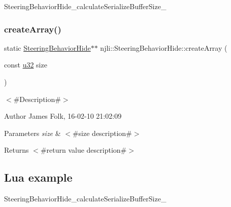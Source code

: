 \begin{DoxyCodeInclude}
\end{DoxyCodeInclude}
Steering\+Behavior\+Hide\+\_\+calculate\+Serialize\+Buffer\+Size\+\_\+ \mbox{\label{classnjli_1_1_steering_behavior_hide_a8fdf4ee83c8a30a75fdf06e111f621a3}} 
\subsubsection{\texorpdfstring{create\+Array()}{createArray()}}
{\footnotesize\ttfamily static \mbox{\hyperlink{classnjli_1_1_steering_behavior_hide}{Steering\+Behavior\+Hide}}$\ast$$\ast$ njli\+::\+Steering\+Behavior\+Hide\+::create\+Array (\begin{DoxyParamCaption}\item[{const \mbox{\hyperlink{_util_8h_a10e94b422ef0c20dcdec20d31a1f5049}{u32}}}]{size }\end{DoxyParamCaption})\hspace{0.3cm}{\ttfamily [static]}}



$<$\#\+Description\#$>$ 

\begin{DoxyAuthor}{Author}
James Folk, 16-\/02-\/10 21\+:02\+:09
\end{DoxyAuthor}

\begin{DoxyParams}{Parameters}
{\em size} & $<$\#size description\#$>$\\
\hline
\end{DoxyParams}
\begin{DoxyReturn}{Returns}
$<$\#return value description\#$>$
\end{DoxyReturn}
\hypertarget{classnjli_1_1_steering_behavior_wander_ex1}{}\subsection{Lua example}\label{classnjli_1_1_steering_behavior_wander_ex1}

\begin{DoxyCodeInclude}
\end{DoxyCodeInclude}
Steering\+Behavior\+Hide\+\_\+calculate\+Serialize\+Buffer\+Size\+\_\+ \mbox{\label{classnjli_1_1_steering_behavior_hide_ac30c8dd972afe41766a71d66298a5585}} 

